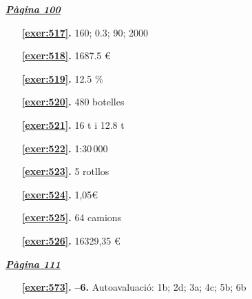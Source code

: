 \hyperlink{page.100}{\textbf{\em Pàgina 100}}
\begin{enumerate}
\item[\fontfamily{phv}\selectfont\color{blue}\textbf{\ref{exer:517}. }] \label{ans:517} 
160; 0.3; 90; 2000
 \end{enumerate}
\begin{enumerate}
\item[\fontfamily{phv}\selectfont\color{blue}\textbf{\ref{exer:518}. }] \label{ans:518} 
1687.5 \euro {}
\item[\fontfamily{phv}\selectfont\color{blue}\textbf{\ref{exer:519}. }] \label{ans:519} 
12.5 \%
\item[\fontfamily{phv}\selectfont\color{blue}\textbf{\ref{exer:520}. }] \label{ans:520} 
480 botelles
\item[\fontfamily{phv}\selectfont\color{blue}\textbf{\ref{exer:521}. }] \label{ans:521} 
16 t i 12.8 t
\item[\fontfamily{phv}\selectfont\color{blue}\textbf{\ref{exer:522}. }] \label{ans:522} 
1:30\,000
\item[\fontfamily{phv}\selectfont\color{blue}\textbf{\ref{exer:523}. }] \label{ans:523} 
5 rotllos
\item[\fontfamily{phv}\selectfont\color{blue}\textbf{\ref{exer:524}. }] \label{ans:524} 
1,05\euro {}
\item[\fontfamily{phv}\selectfont\color{blue}\textbf{\ref{exer:525}. }] \label{ans:525} 
64 camions
\item[\fontfamily{phv}\selectfont\color{blue}\textbf{\ref{exer:526}. }] \label{ans:526} 
16329,35 \euro {}
 \end{enumerate}

 \vspace{1cm} 
 

\vspace{0.3cm}


\hyperlink{page.111}{\textbf{\em Pàgina 111}}
\begin{enumerate}
\item[\fontfamily{phv}\selectfont\color{blue}\textbf{\ref{exer:573}. }] \label{ans:573} 
\textbf {--6.} Autoavaluació: 1b; 2d; 3a; 4c; 5b; 6b
 \end{enumerate}

